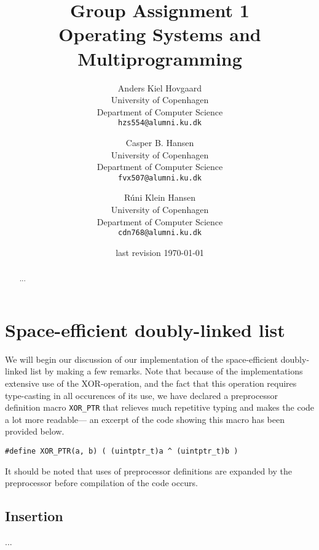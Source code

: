 \documentclass[11pt]{article}
\title
{
    {\Large Group Assignment 1} \\
    Operating Systems and Multiprogramming
}
\author
{
    Anders Kiel Hovgaard \\
    University of Copenhagen \\
    Department of Computer Science \\
    {\tt hzs554@alumni.ku.dk}
    \and
    Casper B. Hansen \\
    University of Copenhagen \\
    Department of Computer Science \\
    {\tt fvx507@alumni.ku.dk}
    \and
    Rúni Klein Hansen \\
    University of Copenhagen \\
    Department of Computer Science \\
    {\tt cdn768@alumni.ku.dk}
}
\date{last revision \today}
\newcommand{\code}[1]{{\tt #1}}
\begin{document}
\clearpage
\maketitle
\thispagestyle{empty}
\begin{multicols}{2}
    \begin{abstract}
    ...
    \end{abstract}
    \vfill\columnbreak
    \tableofcontents\vfill
\end{multicols}
\newpage

\section{Space-efficient doubly-linked list}
We will begin our discussion of our implementation of the space-efficient
doubly-linked list by making a few remarks. Note that because of the
implementations extensive use of the XOR-operation, and the fact that this
operation requires type-casting in all occurences of its use, we have declared
a preprocessor definition macro \code{XOR\_PTR} that relieves much repetitive
typing and makes the code a lot more readable--- an excerpt of the code
showing this macro has been provided below.

\begin{lstlisting}
#define XOR_PTR(a, b) ( (uintptr_t)a ^ (uintptr_t)b )
\end{lstlisting}

It should be noted that uses of preprocessor definitions are expanded by the
preprocessor before compilation of the code occurs.

\subsection{Insertion}
...
\end{document}
